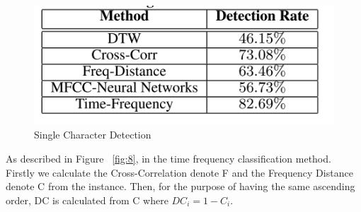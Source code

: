 \documentclass[12pt,a4paper]{article}
\begin{document}
\begin{figure}[h]
\begin{center}
        \includegraphics[scale=0.5]{singleCharDetectionPerfo.png}
        \caption{Single Character Detection}
        \label{fig:7}
\end{center}
\end{figure} \par
\FloatBarrier

\newpage


As described in Figure ~\ref{fig:8}, in the time frequency classification method. Firstly we calculate the Cross-Correlation denote F and the Frequency Distance denote C from the instance. Then, for the purpose of having the same ascending order, DC is calculated from C where $DC_{i} = 1-C_{i}$. \\
\end{document}
